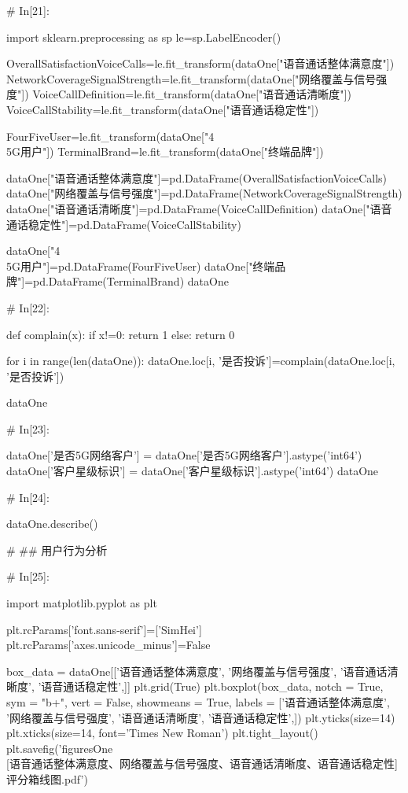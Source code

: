 \documentclass{MathorCupmodeling}
\begin{document}
\begin{python}
# In[21]:


import sklearn.preprocessing as sp
le=sp.LabelEncoder()

OverallSatisfactionVoiceCalls=le.fit_transform(dataOne["语音通话整体满意度"])
NetworkCoverageSignalStrength=le.fit_transform(dataOne["网络覆盖与信号强度"])
VoiceCallDefinition=le.fit_transform(dataOne["语音通话清晰度"])
VoiceCallStability=le.fit_transform(dataOne["语音通话稳定性"])

FourFiveUser=le.fit_transform(dataOne["4\\5G用户"])
TerminalBrand=le.fit_transform(dataOne["终端品牌"])

dataOne["语音通话整体满意度"]=pd.DataFrame(OverallSatisfactionVoiceCalls)
dataOne["网络覆盖与信号强度"]=pd.DataFrame(NetworkCoverageSignalStrength)
dataOne["语音通话清晰度"]=pd.DataFrame(VoiceCallDefinition)
dataOne["语音通话稳定性"]=pd.DataFrame(VoiceCallStability)

dataOne["4\\5G用户"]=pd.DataFrame(FourFiveUser)
dataOne["终端品牌"]=pd.DataFrame(TerminalBrand)
dataOne


# In[22]:


def complain(x):
    if x!=0:
        return 1
    else:
        return 0


for i in range(len(dataOne)):
    dataOne.loc[i, '是否投诉']=complain(dataOne.loc[i, '是否投诉'])

dataOne


# In[23]:


dataOne['是否5G网络客户'] = dataOne['是否5G网络客户'].astype('int64')
dataOne['客户星级标识'] = dataOne['客户星级标识'].astype('int64')
dataOne


# In[24]:


dataOne.describe()


# ## 用户行为分析

# In[25]:


import matplotlib.pyplot as plt

plt.rcParams['font.sans-serif']=['SimHei']
plt.rcParams['axes.unicode_minus']=False

box_data = dataOne[['语音通话整体满意度',
                    '网络覆盖与信号强度',
                    '语音通话清晰度',
                    '语音通话稳定性',]]
plt.grid(True)
plt.boxplot(box_data,
            notch = True,
            sym = "b+",
            vert = False,
            showmeans = True,
            labels = ['语音通话整体满意度',
                      '网络覆盖与信号强度',
                      '语音通话清晰度',
                      '语音通话稳定性',])
plt.yticks(size=14)
plt.xticks(size=14, font='Times New Roman')
plt.tight_layout()
plt.savefig('figuresOne\\[附件1][语音通话整体满意度、网络覆盖与信号强度、语音通话清晰度、语音通话稳定性]评分箱线图.pdf')



\end{python}
\end{document}
